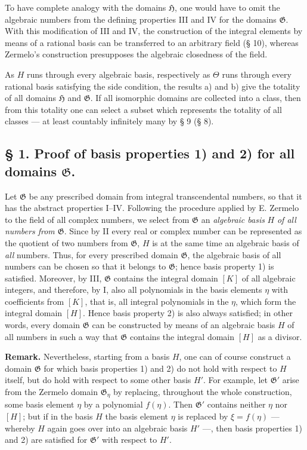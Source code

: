 \documentclass[11pt]{article}
\begin{document}
To have complete analogy with the domains $\mathfrak H$, one would have to omit
the algebraic numbers from the defining properties III and IV for the domains
$\mathfrak G$. With this modification of III and IV, the construction of the
integral elements by means of a rational basis can be transferred to an arbitrary
field (§ 10), whereas Zermelo's construction presupposes the algebraic closedness
of the field.

As $H$ runs through every algebraic basis, respectively as $\Theta$ runs through
every rational basis satisfying the side condition, the results a) and b) give the
totality of all domains $\mathfrak H$ and $\mathfrak G$. If all isomorphic
domains are collected into a class, then from this totality one can select a subset
which represents the totality of all classes --- at least countably infinitely many
by § 9 (§ 8).

\subsection*{§ 1. Proof of basis properties 1) and 2) for all domains
$\mathfrak G$.}

Let $\mathfrak G$ be any prescribed domain from integral transcendental numbers,
so that it has the abstract properties I--IV. Following the procedure applied by
E. Zermelo to the field of all complex numbers, we select from $\mathfrak G$ an
\emph{algebraic basis} $H$ \emph{of all numbers from $\mathfrak G$}. Since by
II every real or complex number can be represented as the quotient of two numbers
from $\mathfrak G$, $H$ is at the same time an algebraic basis of \emph{all}
numbers. Thus, for every prescribed domain $\mathfrak G$, the algebraic basis of
all numbers can be chosen so that it belongs to $\mathfrak G$; hence basis
property 1) is satisfied. Moreover, by III, $\mathfrak G$ contains the integral
domain $[K]$ of all algebraic integers, and therefore, by I, also all polynomials
in the basis elements $\eta$ with coefficients from $[K]$, that is, all integral
polynomials in the $\eta$, which form the integral domain $[H]$. Hence basis
property 2) is also always satisfied; in other words, every domain $\mathfrak G$
can be constructed by means of an algebraic basis $H$ of all numbers in such a way
that $\mathfrak G$ contains the integral domain $[H]$ as a divisor.

\textbf{Remark.} Nevertheless, starting from a basis $H$, one can of course
construct a domain $\mathfrak G$ for which basis properties 1) and 2) do not hold
with respect to $H$ itself, but do hold with respect to some other basis $H'$.
For example, let $\mathfrak G'$ arise from the Zermelo domain
$\mathfrak G_\eta$ by replacing, throughout the whole construction, some basis
element $\eta$ by a polynomial $f(\eta)$. Then $\mathfrak G'$ contains neither
$\eta$ nor $[H]$; but if in the basis $H$ the basis element $\eta$ is replaced by
$\xi=f(\eta)$ --- whereby $H$ again goes over into an algebraic basis $H'$ ---,
then basis properties 1) and 2) are satisfied for $\mathfrak G'$ with respect to
$H'$.
\end{document}
